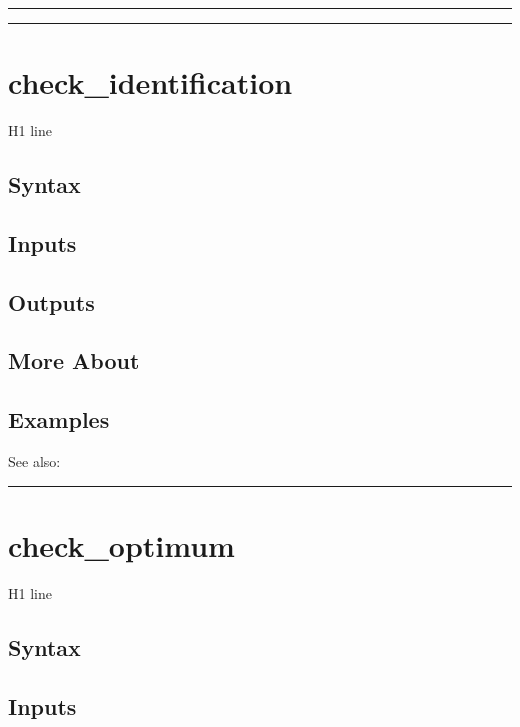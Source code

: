 \documentclass[letterpaper,10pt,english]{sphinxmanual}
\begin{document}
\bigskip\hrule{}\bigskip



\bigskip\hrule{}\bigskip



\section{check\_identification}
\label{classes/models/@rfvar/rfvar:id1}\label{classes/models/@rfvar/rfvar:check-identification}
H1 line


\subsection{Syntax}
\label{classes/models/@rfvar/rfvar:syntax}

\subsection{Inputs}
\label{classes/models/@rfvar/rfvar:inputs}

\subsection{Outputs}
\label{classes/models/@rfvar/rfvar:outputs}

\subsection{More About}
\label{classes/models/@rfvar/rfvar:more-about}

\subsection{Examples}
\label{classes/models/@rfvar/rfvar:examples}
See also:


\bigskip\hrule{}\bigskip



\section{check\_optimum}
\label{classes/models/@rfvar/rfvar:check-optimum}\label{classes/models/@rfvar/rfvar:id2}
H1 line


\subsection{Syntax}
\label{classes/models/@rfvar/rfvar:id3}

\subsection{Inputs}
\label{classes/models/@rfvar/rfvar:id4}
\end{document}
